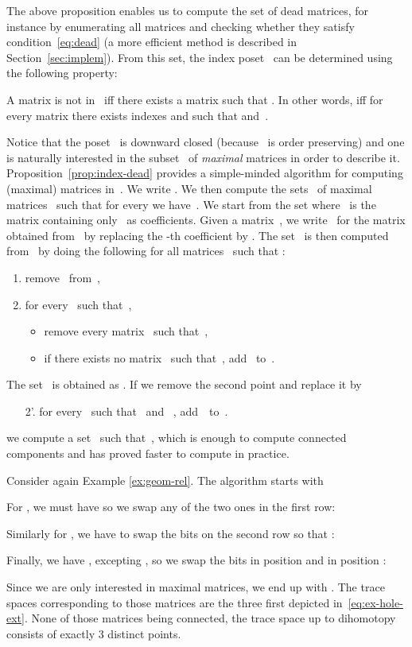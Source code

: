\documentclass[orivec]{llncs} \usepackage[T1]{fontenc}
\newcommand{\nbd}{\nobreakdash-\hspace{0pt}}
\begin{document}
The above proposition enables us to compute the set of dead matrices, for
instance by enumerating all matrices and checking whether they satisfy
condition~\ref{eq:dead} (a more efficient method is described in
Section~\ref{sec:implem}). From this set, the index poset~ can be
determined using the following property:

\begin{proposition}
  \label{prop:index-dead}
  A matrix  is not in~ iff there exists a matrix
  \hbox{} such that . In other words,  iff for
  every matrix \hbox{} there exists indexes  and
   such that  and~.
\end{proposition}

Notice that the poset~ is downward closed (because~ is order
preserving) and one is naturally interested in the subset~ of
\emph{maximal} matrices in order to describe
it. Proposition~\ref{prop:index-dead} provides a simple-minded algorithm for
computing (maximal) matrices in~. We write
. We then compute the sets~ of maximal
matrices~ such that for every  we have~. We
start from the set \hbox{} where~ is the matrix
containing only~ as coefficients. Given a matrix~, we
write~ for the matrix obtained from~ by replacing the
\nbd{}th coefficient by . The set~ is then computed
from~ by doing the following for all matrices~ such that
\hbox{}:
\begin{enumerate}
\item remove~ from~,
\item for every~ such that~,
  \begin{itemize}
  \item remove every matrix~ such that~,\item if there exists no matrix~ such that~,
    add~ to~.
  \end{itemize}
\end{enumerate}
The set~ is obtained as . If we remove the second point and
replace it by
\begin{enumerate}
\item[2'.] for every~ such that~ and
  ~, \hbox{add~ to~.}
\end{enumerate}
we compute a set~ such that~,
which is enough to compute connected components and has proved faster to compute
in practice.

\begin{example}
  \label{exnaive}
  Consider again Example \ref{ex:geom-rel}.
The algorithm starts with
  
  For , we must have  so we swap any of the two ones in the
  first row:
  
  Similarly for , we have to swap the bits on the second row so that
  :
  
  Finally, we have , excepting , so we swap the
  bits in position  and in position :
  
  Since we are only interested in maximal matrices, we end up with
  . The trace spaces corresponding to those matrices are
  the three first depicted in~\eqref{eq:ex-hole-ext}. None of those matrices
  being connected, the trace space up to dihomotopy consists of exactly 3
  distinct points.
\end{example}
\end{document}
